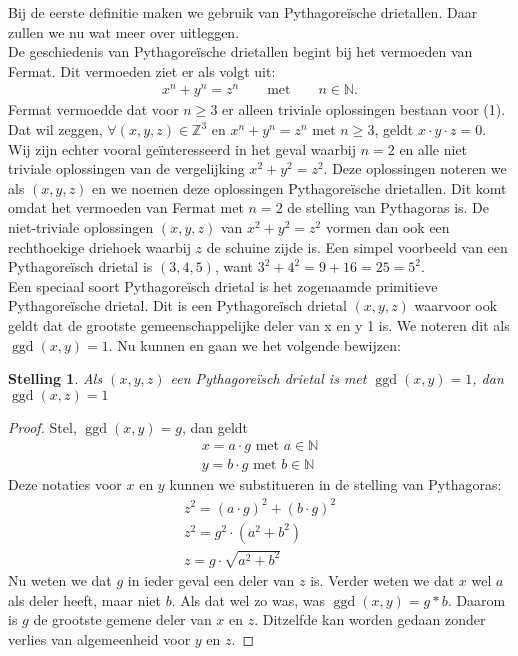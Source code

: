\documentclass[12pt,reqno]{article}
\newcommand*{\NN}{\ensuremath{\mathbb{N}}}
\newcommand*{\ZZ}{\ensuremath{\mathbb{Z}}}
\theoremstyle{theorem}
\newtheorem{theorem}{Stelling}
\theoremstyle{definition}
\DeclareMathOperator{\ggd}{ggd}
\begin{document}
	
	Bij de eerste definitie maken we gebruik van Pythagore\"ische drietallen. Daar zullen we nu wat meer over uitleggen.\\
	
	De geschiedenis van Pythagore\"ische drietallen begint bij het vermoeden van Fermat. Dit vermoeden ziet er als volgt uit:
	\begin{align}
	x^n + y^n = z^n \qquad \text{met} \qquad n \in \NN.
	\end{align}
	Fermat vermoedde dat voor $n \geq 3$ er alleen triviale oplossingen bestaan voor (1). Dat wil zeggen, $\forall (x,y,z) \in \ZZ^3$ en $x^n + y^n = z^n$ met $n \geq 3$, geldt $x \cdot y \cdot z = 0$. \\
	Wij zijn echter vooral ge\"interesseerd in het geval waarbij $n=2$ en alle niet triviale oplossingen van de vergelijking $x^2 + y^2 = z^2$. Deze oplossingen noteren we als $(x,y,z)$ en we noemen deze oplossingen Pythagore\"ische drietallen. Dit komt omdat het vermoeden van Fermat met $n=2$ de stelling van Pythagoras is. De niet-triviale oplossingen $(x,y,z)$ van $x^2 + y^2 = z^2$ vormen dan ook een rechthoekige driehoek waarbij $z$ de schuine zijde is. Een simpel voorbeeld van een Pythagore\"isch drietal is $(3,4,5)$, want $3^2 + 4^2 = 9 + 16 = 25 = 5^2$. \\
	Een speciaal soort Pythagore\"isch drietal is het zogenaamde primitieve \mbox{Pythagore\"ische} drietal. Dit is een Pythagore\"isch drietal $(x,y,z)$ waarvoor ook geldt dat de grootste gemeenschappelijke deler van x en y 1 is. We noteren dit als $\ggd(x,y) = 1$. Nu kunnen en gaan we het volgende bewijzen:
	\begin{theorem}
	Als $(x,y,z)$ een Pythagore\"isch drietal is met $\ggd(x,y) = 1$, dan $\ggd(x,z) = 1$
	\end{theorem}
	\begin{proof}
	Stel, $\ggd(x,y) = g$, dan geldt
	\begin{align*}
	x = a \cdot g \text{ met } a \in \NN \\
	y = b \cdot g \text{ met } b \in \NN
	\end{align*}
	Deze notaties voor $x$ en $y$ kunnen we substitueren in de stelling van Pythagoras:
	\begin{align*}
	z^2=(a\cdot g)^2+(b\cdot g)^2\\
	z^2 = g^2\cdot (a^2 + b^2)\\
	z = g\cdot \sqrt{a^2 + b^2}
	\end{align*}
	Nu weten we dat $g$ in ieder geval een deler van $z$ is. Verder weten we dat $x$ wel $a$ als deler heeft, maar niet $b$. Als dat wel zo was, was $\ggd(x,y) = g*b$. Daarom is $g$ de grootste gemene deler van $x$ en $z$. Ditzelfde kan worden gedaan zonder verlies van algemeenheid voor $y$ en $z$.
	\end{proof}	
\end{document}
